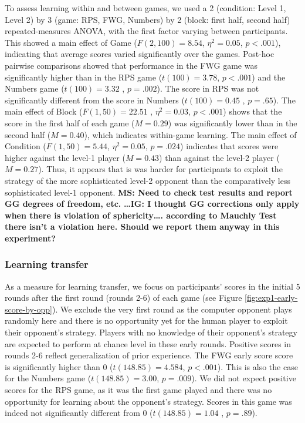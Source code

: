 \documentclass[man,floatsintext]{apa6}
\begin{document}
To assess learning within and between games, we used a 2 (condition: Level 1, Level 2) by 3 (game: RPS, FWG, Numbers) by 2 (block: first half, second half) repeated-measures ANOVA, with the first factor varying between participants. This showed a main effect of Game (\(F(2,100) = 8.54\), \(\eta^{2} = 0.05\), \(p < .001\)), indicating that average scores varied significantly over the games. Post-hoc pairwise comparisons showed that performance in the FWG game was significantly higher than in the RPS game (\(t(100) =3.78\), \(p < .001\)) and the Numbers game (\(t(100) = 3.32\) , \(p = .002\)). The score in RPS was not significantly different from the score in Numbers (\(t(100) = 0.45\) , \(p = .65\)). The main effect of Block (\(F(1,50) = 22.51\) , \(\eta^{2} = 0.03\), \(p < .001\)) shows that the score in the first half of each game (\(M = 0.29\)) was significantly lower than in the second half (\(M = 0.40\)), which indicates within-game learning. The main effect of Condition (\(F(1,50) = 5.44\), \(\eta^{2} = 0.05\), \(p = .024\)) indicates that scores were higher against the level-1 player (\(M = 0.43\)) than against the level-2 player (\(M = 0.27\)). Thus, it appears that is was harder for participants to exploit the strategy of the more sophisticated level-2 opponent than the comparatively less sophisticated level-1 opponent. \textbf{MS: Need to check test results and report GG degrees of freedom, etc.} \textbf{\ldots{}IG: I thought GG corrections only apply when there is violation of sphericity\ldots{}. according to Mauchly Test there isn't a violation here. Should we report them anyway in this experiment? }

\hypertarget{learning-transfer}{%
\subsubsection{Learning transfer}\label{learning-transfer}}

As a measure for learning transfer, we focus on participants' scores in the initial 5 rounds after the first round (rounds 2-6) of each game (see Figure \ref{fig:exp1-early-score-by-opp}). We exclude the very first round as the computer opponent plays randomly here and there is no opportunity yet for the human player to exploit their opponent's strategy. Players with no knowledge of their opponent's strategy are expected to perform at chance level in these early rounds. Positive scores in rounds 2-6 reflect generalization of prior experience. The FWG early score score is significantly higher than 0 (\(t(148.85) = 4.584\), \(p < .001\)). This is also the case for the Numbers game (\(t(148.85) = 3.00\), \(p = .009\)). We did not expect positive scores for the RPS game, as it was the first game played and there was no opportunity for learning about the opponent's strategy. Scores in this game was indeed not significantly different from 0 (\(t(148.85) = 1.04\) , \(p = .89\)).
\end{document}
